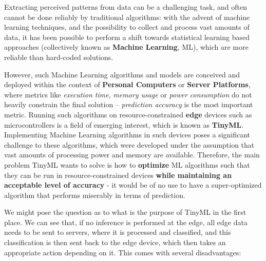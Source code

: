 Extracting perceived patterns from data can be a challenging task, and often cannot be done reliably by traditional algorithms: with the advent of machine learning techniques, and the possibility to collect and process vast amounts of data, it 
has been possible to perform a shift towards statistical learning based approaches (collectively known as \textbf{Machine Learning}, ML), which are more reliable than hard-coded solutions.

However, such Machine Learning algorithms and models are conceived and deployed within the context of \textbf{Personal Computers} or \textbf{Server Platforms}, where metrics like \textit{execution time}, \textit{memory usage} or \textit{power consumption} do not heavily constrain the final solution -- \textit{prediction accuracy} is the most important metric.
Running such algorithms on resource-constrained \textbf{edge} devices such as microcontrollers is a field of emerging interest, which is known as \textbf{TinyML}. 
Implementing Machine Learning algorithms in such devices poses a significant challenge to these algorithms, which were developed under the assumption that vast amounts of processing power and memory are available. 
Therefore, the main problem TinyML wants to solve is how to \textbf{optimize} ML algorithms such that they can be run in resource-constrained devices \textbf{while maintaining an acceptable level of accuracy} - it would be of no use to have a super-optimized algorithm that performs miserably in terms of prediction.

We might pose the question as to what is the purpose of TinyML in the first place. 
We can see that, if no inference is performed at the edge, all edge data needs to be sent to servers, where it is processed and classified, and this classification is then sent back to the edge device, which then takes an appropriate action depending on it. This comes with several disadvantages:

